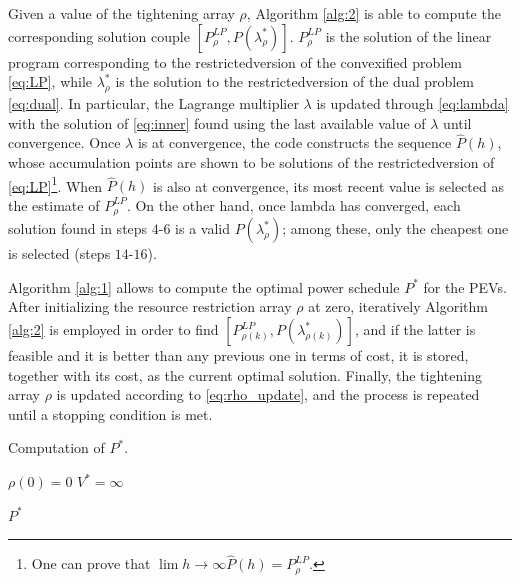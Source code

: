 Given a value of the tightening array $\rho$, Algorithm \ref{alg:2} is able to compute the corresponding solution couple $[P^{LP}_{\rho}, P(\lambda^*_{\rho})]$. $P^{LP}_{\rho}$ is the solution of the linear program corresponding to the restricted\footnotemark[1] version of the convexified problem \ref{eq:LP}, while $\lambda^*_{\rho}$ is the solution to the restricted\footnotemark[1] version of the dual problem \ref{eq:dual}. In particular, the Lagrange multiplier $\lambda$ is updated through \ref{eq:lambda} with the solution of \ref{eq:inner} found using the last available value of $\lambda$ until convergence. Once $\lambda$ is at convergence, the code constructs the sequence $\hat{P}(h)$, whose accumulation points are shown to be solutions of the restricted\footnotemark[1] version of \ref{eq:LP}\footnote[2]{One can prove that $\lim{h \to \infty} \hat{P}(h) = P^{LP}_\rho$.}. When $\hat{P}(h)$ is also at convergence, its most recent value is selected as the estimate of $P_\rho^{LP}$. On the other hand, once lambda has converged, each solution found in steps $4$-$6$ is a valid $P(\lambda^*_{\rho})$; among these, only the cheapest one is selected (steps $14$-$16$).

Algorithm \ref{alg:1} allows to compute the optimal power schedule $P^*$ for the PEVs. After initializing the resource restriction array $\rho$ at zero, iteratively Algorithm \ref{alg:2} is employed in order to find $[P^{LP}_{\rho(k)}, P(\lambda^*_{\rho(k)})]$, and if the latter is feasible and it is better than any previous one in terms of cost, it is stored, together with its cost, as the current optimal solution. Finally, the tightening array $\rho$ is updated according to \ref{eq:rho_update}, and the process is repeated until a stopping condition is met.

\begin{algorithm}[H]
    \caption{Computation of $P^*$.}
    \label{alg:1}

    $\rho(0) = 0$\;
    $V^* = \infty$\;
    
    \Return $P^*$\;
\end{algorithm}

